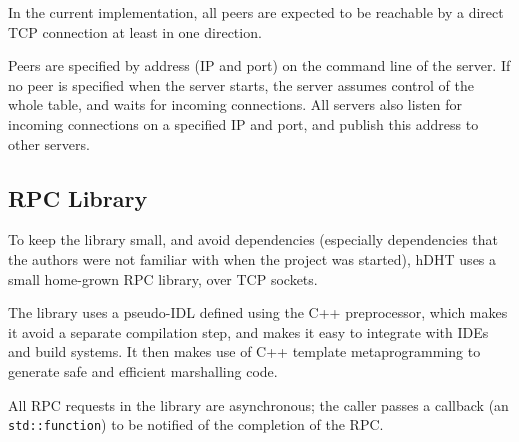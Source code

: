 In the current implementation, all peers are expected to be reachable by a direct TCP connection at least in one direction.

Peers are specified by address (IP and port) on the command line of the server.
If no peer is specified when the server starts, the server assumes control of the whole table, and waits for incoming connections.
All servers also listen for incoming connections on a specified IP and port, and publish this address to other servers.

\subsection{RPC Library}

To keep the library small, and avoid dependencies (especially dependencies that the authors were not familiar with when the project was started), hDHT uses a small home-grown RPC library, over TCP sockets.

The library uses a pseudo-IDL defined using the C++ preprocessor, which makes it avoid a separate compilation step, and makes it easy to integrate with IDEs and build systems.
It then makes use of C++ template metaprogramming to generate safe and efficient marshalling code.

All RPC requests in the library are asynchronous; the caller passes a callback (an \texttt{std::function}) to be notified of the completion of the RPC.
